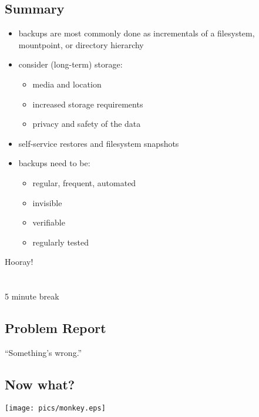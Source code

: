 \documentclass[xga]{xdvislides}
\begin{document}
\subsection{Summary}
\begin{itemize}
	\item backups are most commonly done as incrementals
		of a filesystem, mountpoint, or directory hierarchy
	\item consider (long-term) storage:
		\begin{itemize}
			\item media and location
			\item increased storage requirements
			\item privacy and safety of the data
		\end{itemize}
	\item self-service restores and filesystem snapshots
	\item backups need to be:
		\begin{itemize}
			\item regular, frequent, automated
			\item invisible
			\item verifiable
			\item regularly tested
		\end{itemize}
\end{itemize}

\newpage
\vspace*{\fill}
\begin{center}
	\Hugesize
		Hooray!\\ [1em]
	\hspace*{5mm}
	\blueline\\
	\hspace*{5mm}\\
		5 minute break
\end{center}
\vspace*{\fill}


\subsection{Problem Report}
\vspace*{\fill}
\Huge
\begin{center}
``Something's wrong.''
\end{center}
\Normalsize
\vspace*{\fill}

\subsection{Now what?}
\begin{center}
	\texttt{[image: pics/monkey.eps]}
\end{center}
\end{document}
